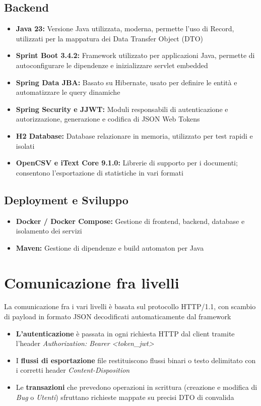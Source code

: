 \subsection{Backend}
\begin{itemize}[itemsep=2pt]
    \item \textbf{Java 23:} Versione Java utilizzata, moderna, permette l'uso di Record, utilizzati per la mappatura dei Data Transfer Object (DTO)
    \item \textbf{Sprint Boot 3.4.2:} Framework utilizzato per applicazioni Java, permette di autoconfigurare le dipendenze e inizializzare servlet embedded
    \item \textbf{Spring Data JBA:} Basato su Hibernate, usato per definire le entità e automatizzare le query dinamiche
    \item \textbf{Spring Security e JJWT:} Moduli responsabili di autenticazione e autorizzazione, generazione e codifica di JSON Web Tokens
    \item \textbf{H2 Database:} Database relazionare in memoria, utilizzato per test rapidi e isolati
    \item \textbf{OpenCSV e iText Core 9.1.0:} Librerie di supporto per i documenti; consentono l'esportazione di statistiche in vari formati
\end{itemize}

\newpage

\subsection{Deployment e Sviluppo}
\begin{itemize}[itemsep=2pt]
    \item \textbf{Docker / Docker Compose:} Gestione di frontend, backend, database e isolamento dei servizi
    \item \textbf{Maven:} Gestione di dipendenze e build automaton per Java
\end{itemize}
\newpage

\section{Comunicazione fra livelli}
La comunicazione fra i vari livelli è basata sul protocollo HTTP/1.1, con scambio di payload in formato JSON decodificati automaticamente dal framework
\begin{itemize}[itemsep=2pt]
    \item \textbf{L'autenticazione} è passata in ogni richiesta HTTP dal client tramite l'header \textit{Authorization: Bearer <token\_jwt>}
    \item I\textbf{ flussi di esportazione} file restituiscono flussi binari o testo delimitato con i corretti header \textit{Content-Disposition}
    \item Le \textbf{transazioni} che prevedono operazioni in scrittura (creazione e modifica di \textit{Bug} o \textit{Utenti}) sfruttano richieste mappate su precisi DTO di convalida
\end{itemize}


